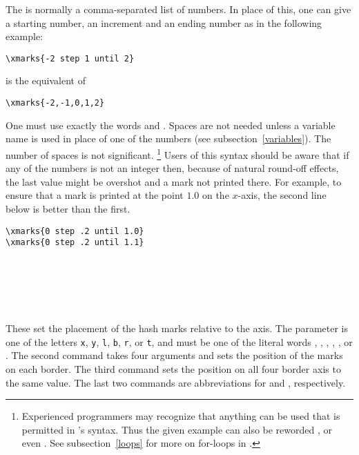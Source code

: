 \documentclass[letterpaper]{article}
\begin{document}
The  is normally a comma-separated list of numbers. In
place of this, one can give a starting number, an increment and an
ending number as in the following example:
\begin{verbatim}
\xmarks{-2 step 1 until 2}
\end{verbatim}
is the equivalent of
\begin{verbatim}
\xmarks{-2,-1,0,1,2}
\end{verbatim}

One must use exactly the words  and . Spaces are
not needed unless a variable name is used in place of one of the
numbers (see subsection~\ref{variables}). The number of spaces is not
significant.%
    \footnote{Experienced \MF{} programmers may recognize that anything
    can be used that is permitted in \MF{}'s  syntax. Thus
    the given example can also be reworded ,
    or even . See subsection~\ref{loops}
    for more on for-loops in \mfp{}.} %
Users of this syntax should be aware that if any of the numbers is not
an integer then, because of natural round-off effects, the last value
might be overshot and a mark not printed there. For example, to ensure
that a mark is printed at the point $1.0$ on the $x$-axis, the second
line below is better than the first.
\begin{verbatim}
\xmarks{0 step .2 until 1.0}
\xmarks{0 step .2 until 1.1}
\end{verbatim}

\begin{cd}
\\
\\
\\
\\
%
%
%
%
%
%
\end{cd}

These set the placement of the hash marks relative to the axis. The
parameter  is one of the letters \texttt{x}, \texttt{y}, \texttt{l},
\texttt{b}, \texttt{r}, or \texttt{t}, and  must be one of the literal
words , , , ,
,  or . The second command takes
four arguments and sets the position of the marks on each border. The
third command sets the position on all four border axis to the same
value. The last two commands are abbreviations for
 and
, respectively.
\end{document}
